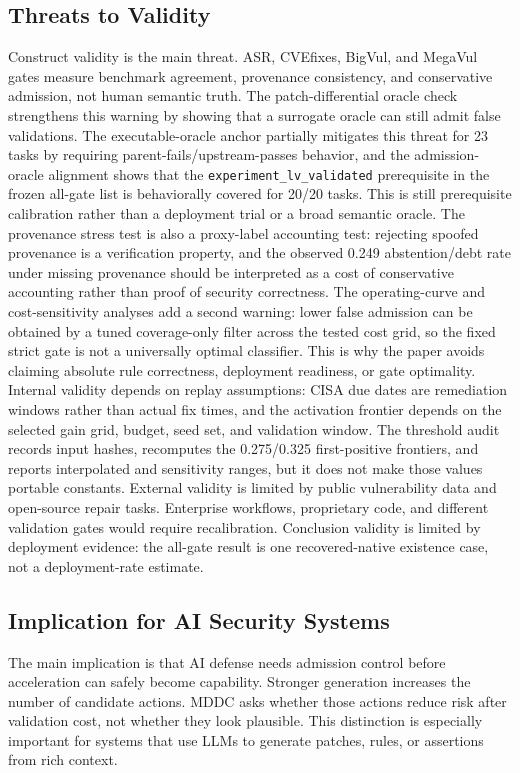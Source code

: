 ﻿\documentclass[lettersize,journal]{IEEEtran}
\begin{document}
\subsection{Threats to Validity}
Construct validity is the main threat. ASR, CVEfixes, BigVul, and MegaVul gates measure benchmark agreement, provenance consistency, and conservative admission, not human semantic truth. The patch-differential oracle check strengthens this warning by showing that a surrogate oracle can still admit false validations. The executable-oracle anchor partially mitigates this threat for 23 tasks by requiring parent-fails/upstream-passes behavior, and the admission-oracle alignment shows that the \texttt{experiment\_lv\_validated} prerequisite in the frozen all-gate list is behaviorally covered for 20/20 tasks. This is still prerequisite calibration rather than a deployment trial or a broad semantic oracle. The provenance stress test is also a proxy-label accounting test: rejecting spoofed provenance is a verification property, and the observed 0.249 abstention/debt rate under missing provenance should be interpreted as a cost of conservative accounting rather than proof of security correctness. The operating-curve and cost-sensitivity analyses add a second warning: lower false admission can be obtained by a tuned coverage-only filter across the tested cost grid, so the fixed strict gate is not a universally optimal classifier. This is why the paper avoids claiming absolute rule correctness, deployment readiness, or gate optimality. Internal validity depends on replay assumptions: CISA due dates are remediation windows rather than actual fix times, and the activation frontier depends on the selected gain grid, budget, seed set, and validation window. The threshold audit records input hashes, recomputes the 0.275/0.325 first-positive frontiers, and reports interpolated and sensitivity ranges, but it does not make those values portable constants. External validity is limited by public vulnerability data and open-source repair tasks. Enterprise workflows, proprietary code, and different validation gates would require recalibration. Conclusion validity is limited by deployment evidence: the all-gate result is one recovered-native existence case, not a deployment-rate estimate.

\subsection{Implication for AI Security Systems}
The main implication is that AI defense needs admission control before acceleration can safely become capability. Stronger generation increases the number of candidate actions. MDDC asks whether those actions reduce risk after validation cost, not whether they look plausible. This distinction is especially important for systems that use LLMs to generate patches, rules, or assertions from rich context.
\end{document}
